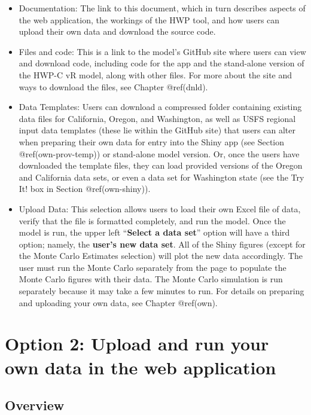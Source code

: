 \documentclass[
  openany]{book}
\begin{document}
\begin{itemize}
\item
  Documentation: The link to this document, which in turn describes
  aspects of the web application, the workings of the HWP tool, and how
  users can upload their own data and download the source code.
\item
  Files and code: This is a link to the model's GitHub site where users
  can view and download code, including code for the app and the
  stand-alone version of the HWP-C vR model, along with other files. For
  more about the site and ways to download the files, see Chapter
  @ref(dnld).
\item
  Data Templates: Users can download a compressed folder containing
  existing data files for California, Oregon, and Washington, as well as
  USFS regional input data templates (these lie within the GitHub site)
  that users can alter when preparing their own data for entry into the
  Shiny app (see Section @ref(own-prov-temp)) or stand-alone model
  version. Or, once the users have downloaded the template files, they
  can load provided versions of the Oregon and California data sets, or
  even a data set for Washington state (see the Try It! box in Section
  @ref(own-shiny)).
\item
  Upload Data: This selection allows users to load their own Excel file
  of data, verify that the file is formatted completely, and run the
  model. Once the model is run, the upper left ``\textbf{Select a data
  set}'' option will have a third option; namely, the \textbf{user's new
  data set}. All of the Shiny figures (except for the Monte Carlo
  Estimates selection) will plot the new data accordingly. The user must
  run the Monte Carlo separately from the page to populate the Monte
  Carlo figures with their data. The Monte Carlo simulation is run
  separately because it may take a few minutes to run. For details on
  preparing and uploading your own data, see Chapter @ref(own).
\end{itemize}

\hypertarget{own}{%
\chapter{Option 2: Upload and run your own data in the web
application}\label{own}}

\hypertarget{own-over}{%
\section{Overview}\label{own-over}}
\end{document}
